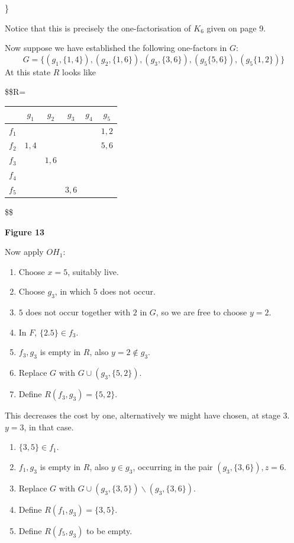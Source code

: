\documentclass[
  12pt,
  a4paper]{book}
\begin{document}
\}

Notice that this is precisely the one-factorisation of \(K_6\) given
on page 9.

Now suppose we have established the following one-factors in \(G\):
\[G=\{(g_1,\{1,4\}),(g_2,\{1,6\}),(g_3,\{3,6\}),(g_5\{5,6\}),(g_5\{1,2\})\}\]
At this state \(R\) looks like

\$\$R=

\begin{longtable}[]{@{}lccccc@{}}
\toprule
& \(g_1\) & \(g_2\) & \(g_3\) & \(g_4\) & \(g_5\)\tabularnewline
\midrule
\endhead
\(f_1\) & & & & & \(1,2\)\tabularnewline
\(f_2\) & \(1,4\) & & & & \(5,6\)\tabularnewline
\(f_3\) & & \(1,6\) & & &\tabularnewline
\(f_4\) & & & & &\tabularnewline
\(f_5\) & & & \(3,6\) & &\tabularnewline
\bottomrule
\end{longtable}

\$\$

\textbf{Figure 13}

Now apply \(OH_1\):

\begin{enumerate}
\def\labelenumi{\arabic{enumi}.}
\item
  Choose \(x=5\), suitably live.
\item
  Choose \(g_3\), in which \(5\) does not occur.
\item
  \(5\) does not occur together with \(2\) in \(G\), so we are free to
  choose \(y=2\).
\item
  In \(F\), \(\{2.5\} \in f_3\).
\item
  \(f_3,g_3\) is empty in \(R\), also \(y=2 \notin g_3\).
\item
  Replace \(G\) with \(G \cup (g_3,\{5,2\})\).
\item
  Define \(R(f_3,g_3)=\{5,2\}\).
\end{enumerate}

This decreases the cost by one, alternatively we might have chosen, at
stage 3. \(y=3\), in that case.

\begin{enumerate}
\def\labelenumi{\arabic{enumi}.}
\setcounter{enumi}{3}
\item
  \(\{3,5\} \in f_1\).
\item
  \(f_1,g_3\) is empty in \(R\), also \(y \in g_3\), occurring in the pair
  \((g_3,\{3,6\}), z=6\).
\item
  Replace \(G\) with \(G \cup (g_3,\{3,5\}) \backslash (g_3,\{3,6\})\).
\item
  Define \(R(f_1,g_3)=\{3,5\}\).
\item
  Define \(R(f_5,g_3)\) to be empty.
\end{enumerate}
\end{document}
